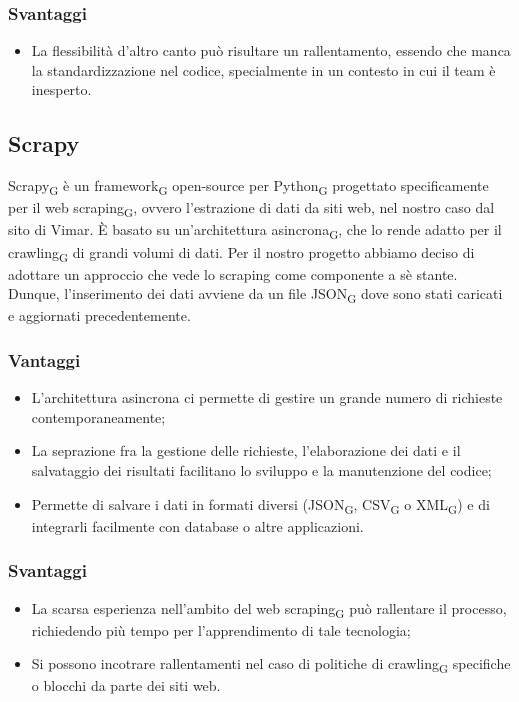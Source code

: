 \subsubsection{Svantaggi}
\begin{itemize}
    \item La flessibilità d'altro canto può risultare un rallentamento, essendo che manca la standardizzazione nel codice, specialmente in un contesto in cui il team è inesperto.
\end{itemize}

\subsection{Scrapy}
Scrapy\textsubscript{G} è un framework\textsubscript{G} open-source per Python\textsubscript{G} progettato specificamente per il web scraping\textsubscript{G}, ovvero l'estrazione di dati da siti web, nel nostro caso dal sito di Vimar. È basato su un'architettura asincrona\textsubscript{G}, che lo rende adatto per il crawling\textsubscript{G} di grandi volumi di dati. Per il nostro progetto abbiamo deciso di adottare un approccio che vede lo scraping come componente a sè stante. Dunque, l'inserimento dei dati avviene da un file JSON\textsubscript{G} dove sono stati caricati e aggiornati precedentemente.
\subsubsection{Vantaggi}
\begin{itemize}
    \item L'architettura asincrona ci permette di gestire un grande numero di richieste contemporaneamente;
    \item La seprazione fra la gestione delle richieste, l'elaborazione dei dati e il salvataggio dei risultati facilitano lo sviluppo e la manutenzione del codice;
    \item Permette di salvare i dati in formati diversi (JSON\textsubscript{G}, CSV\textsubscript{G} o XML\textsubscript{G}) e di integrarli facilmente con database o altre applicazioni.
\end{itemize}
\subsubsection{Svantaggi}
\begin{itemize}
    \item La scarsa esperienza nell'ambito del web scraping\textsubscript{G} può rallentare il processo, richiedendo più tempo per l'apprendimento di tale tecnologia;
    \item Si possono incotrare rallentamenti nel caso di politiche di crawling\textsubscript{G} specifiche o blocchi da parte dei siti web.
\end{itemize}


